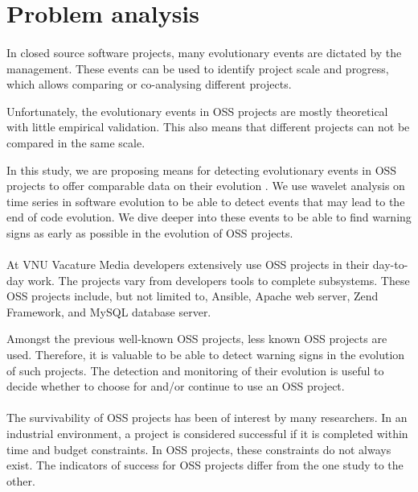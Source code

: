 \section{Problem analysis}
\paragraph{}
In closed source software projects, many evolutionary events are dictated by the
management. These events can be used to identify project scale and progress,
which allows comparing or co-analysing different projects.

Unfortunately, the evolutionary events in OSS projects are mostly theoretical
with little empirical validation. This also means that different projects can
not be compared in the same scale.

In this study, we are proposing means for detecting evolutionary events in OSS
projects to offer comparable data on their evolution \cite{karus2013}. We use
wavelet analysis on time series in software evolution to be able to detect
events that may lead to the end of code evolution. We dive deeper into these
events to be able to find warning signs as early as possible in the evolution
of OSS projects.

\paragraph{}
At VNU Vacature Media developers extensively use OSS projects in their
day-to-day work. The projects vary from developers tools to complete subsystems.
These OSS projects include, but not limited to, Ansible, Apache web server, Zend
Framework, and MySQL database server.

Amongst the previous well-known OSS projects, less known OSS projects are used.
Therefore, it is valuable to be able to detect warning signs in the
evolution of such projects. The detection and monitoring of their evolution is
useful to decide whether to choose for and/or continue to use an OSS project.

\paragraph{}
The survivability of OSS projects has been of interest by many researchers. In
an industrial environment, a project is considered successful if it is completed
within time and budget constraints. In OSS projects, these constraints do not
always exist. The indicators of success for OSS projects differ from the one
study to the other.

